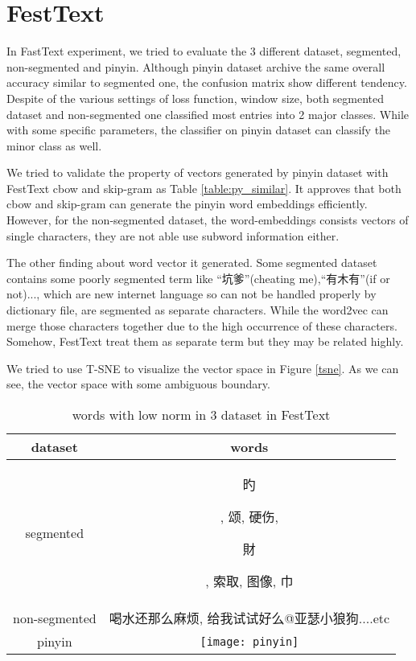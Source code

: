 \section{FestText}

In FastText experiment, we tried to evaluate the 3 different dataset, segmented, non-segmented and pinyin. 
Although pinyin dataset archive the same overall accuracy similar to segmented one, the confusion matrix show different tendency.
Despite of the various settings of loss function, window size, both segmented dataset and non-segmented one classified most entries into 2 major classes.
While with some specific parameters, the classifier on pinyin dataset can classify the minor class as well. 

We tried to validate the property of vectors generated by pinyin dataset with FestText cbow and skip-gram as Table \ref{table:py_similar}. 
It approves that both cbow and skip-gram can generate the pinyin word embeddings efficiently. 
However, for the non-segmented dataset, the word-embeddings consists vectors of single characters, they are not able use subword information either.

The other finding about word vector it generated. 
Some segmented dataset contains some poorly segmented term like \enquote{坑爹}(cheating me),\enquote{有木有}(if or not)..., which are new internet language so can not be handled properly by dictionary file, are segmented as separate characters.  
While the word2vec can merge those characters together due to the high occurrence of these characters. 
Somehow, FestText treat them as separate term but they may be related highly.

We tried to use T-SNE to visualize the vector space in Figure \ref{tsne}. As we can see, the vector space with some ambiguous boundary.


\begin{CJK}{UTF8}{gbsn}
\begin{table}[]
\centering
\caption{words with low norm in 3 dataset in FestText}
\label{table:lownorm}
\begin{tabular}{|c|c|}
\hline
 dataset  & words  \\
\hline
segmented  & \begin{CJK}{UTF8}{bkai} 旳\end{CJK}, 颂, 硬伤, \begin{CJK}{UTF8}{bkai}財\end{CJK}, 索取, 图像, 巾 \\
non-segmented  & 喝水还那么麻烦, 给我试试好么@亚瑟小狼狗....etc   \\
pinyin     &         \texttt{[image: pinyin]} \\   
\hline
\end{tabular}
\end{table}
\end{CJK}


